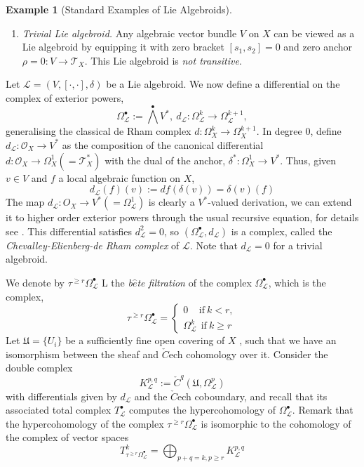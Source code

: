 \documentclass[12pt,reqno]{amsart}
\numberwithin{equation}{subsection}
\theoremstyle{definition}
\newtheorem{example}[equation]{Example}
\theoremstyle{theorem}
\begin{document}
\begin{example}[Standard Examples of Lie Algebroids]
\begin{enumerate}
		
		\item \textit{Trivial Lie algebroid.}  
		Any algebraic vector bundle $V$ on $X$ can be viewed as a Lie algebroid by equipping it with zero bracket $[s_1,s_2]=0$
		and zero anchor $\rho = 0 : V \to \mathcal{T}_X.$
		This Lie algebroid is \emph{not transitive}.
		
	\end{enumerate}
\end{example}

Let $\mathcal{L} = (V ,[\cdot,\cdot],\delta)$ be a Lie algebroid. We now define a differential on the complex of exterior powers, $$\Omega^{\bullet}_{\mathcal{L}} := \bigwedge^{\bullet}V^{*}, \ d_{\mathcal{L}}:\Omega^{k}_{\mathcal{L}}\rightarrow \Omega^{k+1}_{\mathcal{L}},$$
generalising the classical de Rham complex $d :\Omega^{k}_{X}\rightarrow \Omega^{k+1}_{X}$. In degree $0$, define $d_{\mathcal{L}}: \mathcal{O}_{X} \rightarrow V^{\ast}$ as the
composition of the canonical differential $d : \mathcal{O}_{X}\rightarrow \Omega_{X}^{1}(=\mathcal{T}^{*}_{X})$ with the dual of the anchor, $\delta^{*}: \Omega^{1}_{X} \rightarrow V^{\ast}$. Thus, given $v \in V$ and $f$ a local algebraic function on $X$,
\[d_{\mathcal{L}}(f)(v):=df(\delta(v))=\delta(v)(f)\]
The map $d_{\mathcal{L}} : O_{X} \rightarrow V^{*}(=\Omega^{1}_{\mathcal{L}})$ is clearly a $V^{*}$-valued derivation, we can extend it to higher order exterior powers through the usual recursive equation, for details see \cite[\S\,3.1]{Alfaya-Oliveire-2024}. This differential satisfies $d_{\mathcal{L}}^{2}=0$, so $(\Omega^{\bullet}_{\mathcal{L}},d_{\mathcal{L}})$ is a complex, called the \textit{Chevalley-Elienberg-de Rham complex} of $\mathcal{L}$. Note that $d_{\mathcal{L}}=0$ for a trivial algebroid.

We denote by $\tau^{\geqslant r}\Omega^{\bullet}_{\mathcal{L}}$
L the \textit{b$\hat{e}$te filtration }of the complex $\Omega^{\bullet}_{\mathcal{L}}$, which is the complex,
\[\tau^{\geqslant r}\Omega^{\bullet}_{\mathcal{L}}=
\begin{cases}
0 \ \ \ \ \ \text{if} \ k<r,\\
\Omega^{k}_{\mathcal{L}} \ \ \text{if} \ k\geqslant r
\end{cases}\]
Let $\mathfrak{U} = \{U_{i}\}$ be a sufficiently fine open covering of $X$ , such that we have an isomorphism between the sheaf and $\check{C}$ech cohomology over it. Consider the double complex
\[
K^{p,q}_{\mathcal{L}}:=\check{C}^{q}(\mathfrak{U},\Omega^{p}_{\mathcal{L}})
\] with differentials given by $d_{\mathcal{L}}$ and the $\check{C}$ech coboundary, and recall that its associated total complex $T^{\bullet}_{\mathcal{L}}$ computes the hypercohomology of $\Omega^{\bullet}_{\mathcal{L}}$. Remark that
the hypercohomology of the complex $\tau^{\geqslant r}\Omega^{\bullet}_{\mathcal{L}}$ is isomorphic to the cohomology of the
complex of vector spaces
\[T^{k}_{\tau^{\geqslant r}\Omega^{\bullet}_{\mathcal{L}}}=\bigoplus_{p+q=k,p\geqslant r}K^{p,q}_{\mathcal{L}}\]
\end{document}
